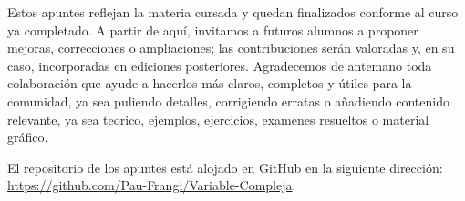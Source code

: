 Estos apuntes reflejan la materia cursada y quedan finalizados conforme al curso ya completado. A partir de aquí, invitamos a futuros alumnos a proponer mejoras, correcciones o ampliaciones; las contribuciones serán valoradas y, en su caso, incorporadas en ediciones posteriores. Agradecemos de antemano toda colaboración que ayude a hacerlos más claros, completos y útiles para la comunidad, ya sea puliendo detalles, corrigiendo erratas o añadiendo contenido relevante, ya sea teorico, ejemplos, ejercicios, examenes resueltos o material gráfico.

El repositorio de los apuntes está alojado en GitHub en la siguiente dirección: \url{https://github.com/Pau-Frangi/Variable-Compleja}.